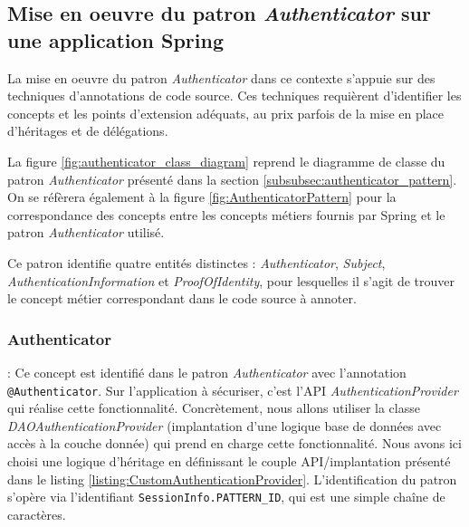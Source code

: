 \subsection{Mise en oeuvre du patron \textit{Authenticator} sur une application Spring}


La mise en oeuvre du patron \textit{Authenticator} dans ce contexte s'appuie sur des techniques d'annotations de code source. Ces techniques requièrent d'identifier les concepts et les points d'extension adéquats, au prix parfois de la mise en place d'héritages et de délégations.

La figure \ref{fig:authenticator_class_diagram} reprend le diagramme de classe du patron \textit{Authenticator} présenté dans la section \ref{subsubsec:authenticator_pattern}. On se réfèrera également à la figure \ref{fig:AuthenticatorPattern} pour la correspondance des concepts entre les concepts métiers fournis par Spring et le patron \textit{Authenticator} utilisé.

Ce patron identifie quatre entités distinctes : \textit{Authenticator}, \textit{Subject}, \textit{AuthenticationInformation} et \textit{ProofOfIdentity}, pour lesquelles il s'agit de trouver le concept métier correspondant dans le code source à annoter.

\subsubsection{Authenticator} : Ce concept est identifié dans le patron \textit{Authenticator} avec l'annotation \texttt{@Authenticator}. Sur l'application à sécuriser, c'est l'API \textit{AuthenticationProvider} qui réalise cette fonctionnalité. Concrètement, nous allons utiliser la classe \textit{DAOAuthenticationProvider} (implantation d'une logique base de données avec accès à la couche donnée) qui prend en charge cette fonctionnalité. Nous avons ici choisi une logique d'héritage en définissant le couple API/implantation présenté dans le listing \ref{listing:CustomAuthenticationProvider}. L'identification du patron s'opère via l'identifiant \texttt{SessionInfo.PATTERN\_ID}, qui est une simple chaîne de caractères.

